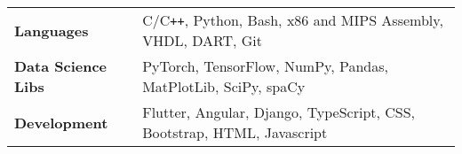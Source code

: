 \documentclass[10pt]{article}
\def\Plus{\texttt{\texttt{+}}}
\newcommand{\xfill}[2][1ex]{
	\dimen0=#2\advance\dimen0 by #1
	\leaders\hrule height \dimen0 depth -#1\hfill
}
\renewcommand{\section}[1]{
	\vspace{5pt}
	{\color{Blue}{\Large\scshape\raggedright #1\xfill[0pt]{0.5pt}}}
}
\begin{document}
\section{Technical Skills}
\vspace{3pt}
\begin{tabularx}{\textwidth}{ p{4cm}  m{13.5cm} }
	\textbf{Languages} \vspace{3pt} & \vspace{2pt}C/C\Plus\Plus, Python, Bash, x86 and MIPS Assembly, VHDL, DART, Git\\ 
	\textbf{Data Science Libs}\vspace{3pt} & PyTorch, TensorFlow, NumPy, Pandas, MatPlotLib, SciPy, spaCy \\
	\textbf{Development}\vspace{3pt} & Flutter, Angular, Django, TypeScript, CSS, Bootstrap, HTML, Javascript \\
 
\end{tabularx}
\newpage
{}
\end{document}
